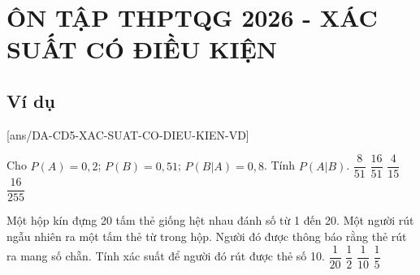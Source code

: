 \setcounter{ex}{0}
\setcounter{vd}{0}
\section*{ÔN TẬP THPTQG 2026 - XÁC SUẤT CÓ ĐIỀU KIỆN}
\subsection{Ví dụ}
[ans/DA-CD5-XAC-SUAT-CO-DIEU-KIEN-VD]
\begin{vd} %
    Cho $P(A) = 0,2$; $P(B) = 0,51$; $P(B | A) = 0,8$. Tính $P(A | B)$.
    \choice
    { $\dfrac{8}{51}$ }
    {\True $\dfrac{16}{51}$ }
    { $\dfrac{4}{15}$ }
    { $\dfrac{16}{255}$ }
\end{vd}
\begin{vd} %
    Một hộp kín đựng 20 tấm thẻ giống hệt nhau đánh số từ 1 đến 20. Một người rút ngẫu nhiên ra một tấm thẻ từ trong hộp. Người đó được thông báo rằng thẻ rút ra mang số chẵn. Tính xác suất để người đó rút được thẻ số 10.
    \choice
    { $\dfrac{1}{20}$ }
    { $\dfrac{1}{2}$ }
    {\True $\dfrac{1}{10}$ }
    { $\dfrac{1}{5}$ }
\end{vd}
